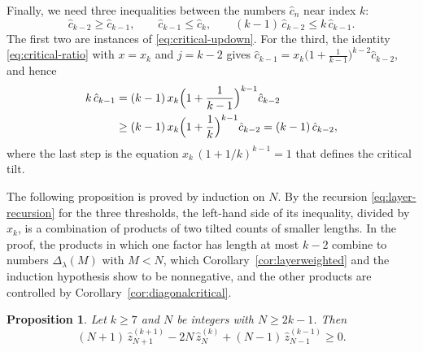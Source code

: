 \documentclass{amsart}
\newtheorem{proposition}[theorem]{Proposition}
\theoremstyle{definition}
\theoremstyle{remark}
\numberwithin{equation}{section}
\begin{document}
Finally, we need three inequalities between the numbers $\hat c_n$ near index $k$:
\begin{equation}\label{eq:layer-cayley}
\hat c_{k-2}\ge\hat c_{k-1},\qquad \hat c_{k-1}\le\hat c_k,\qquad (k-1)\,\hat c_{k-2}\le k\,\hat c_{k-1}.
\end{equation}
The first two are instances of \eqref{eq:critical-updown}. For the third, the identity \eqref{eq:critical-ratio} with $x=x_k$ and $j=k-2$ gives $\hat c_{k-1}=x_k\bigl(1+\frac{1}{k-1}\bigr)^{k-2}\hat c_{k-2}$, and hence
\begin{align*}
k\,\hat c_{k-1}&=(k-1)\,x_k\Bigl(1+\frac{1}{k-1}\Bigr)^{k-1}\hat c_{k-2}\\
&\ge(k-1)\,x_k\Bigl(1+\frac{1}{k}\Bigr)^{k-1}\hat c_{k-2}=(k-1)\,\hat c_{k-2},
\end{align*}
where the last step is the equation $x_k\,(1+1/k)^{k-1}=1$ that defines the critical tilt.

The following proposition is proved by induction on $N$. By the recursion \eqref{eq:layer-recursion} for the three thresholds, the left-hand side of its inequality, divided by $x_k$, is a combination of products of two tilted counts of smaller lengths. In the proof, the products in which one factor has length at most $k-2$ combine to numbers $\Delta_\lambda(M)$ with $M<N$, which Corollary~\ref{cor:layerweighted} and the induction hypothesis show to be nonnegative, and the other products are controlled by Corollary~\ref{cor:diagonalcritical}.

\begin{proposition}\label{prop:beyondlayer}
Let $k\ge 7$ and $N$ be integers with $N\ge 2k-1$. Then
\[
(N+1)\,\hat z^{(k+1)}_{N+1}-2N\,\hat z^{(k)}_N+(N-1)\,\hat z^{(k-1)}_{N-1}\ge 0.
\]
\end{proposition}
\end{document}
